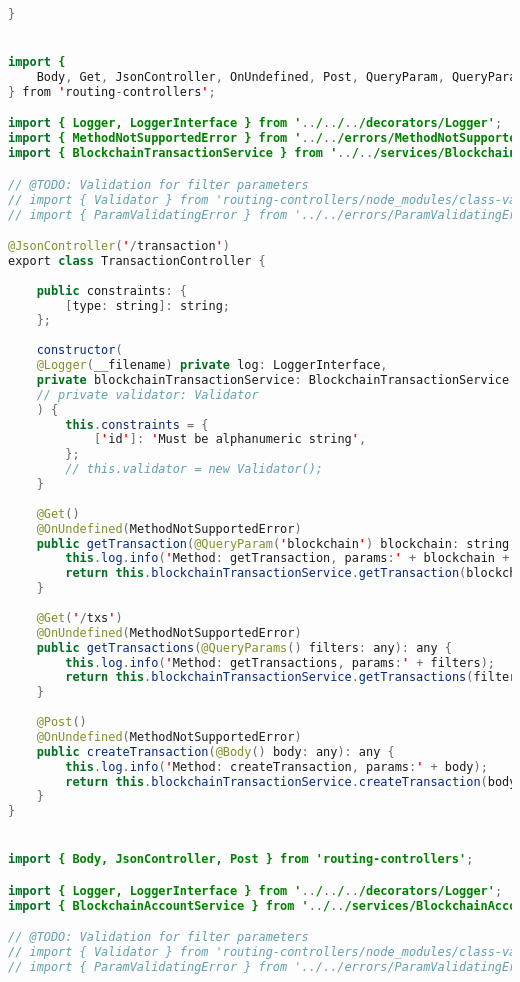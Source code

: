 \begin{lstlisting}[language=java]
}


import {
	Body, Get, JsonController, OnUndefined, Post, QueryParam, QueryParams
} from 'routing-controllers';

import { Logger, LoggerInterface } from '../../../decorators/Logger';
import { MethodNotSupportedError } from '../../errors/MethodNotSupportedError';
import { BlockchainTransactionService } from '../../services/BlockchainTransactionService';

// @TODO: Validation for filter parameters
// import { Validator } from 'routing-controllers/node_modules/class-validator';
// import { ParamValidatingError } from '../../errors/ParamValidatingError';

@JsonController('/transaction')
export class TransactionController {
	
	public constraints: {
		[type: string]: string;
	};
	
	constructor(
	@Logger(__filename) private log: LoggerInterface,
	private blockchainTransactionService: BlockchainTransactionService
	// private validator: Validator
	) {
		this.constraints = {
			['id']: 'Must be alphanumeric string',
		};
		// this.validator = new Validator();
	}
	
	@Get()
	@OnUndefined(MethodNotSupportedError)
	public getTransaction(@QueryParam('blockchain') blockchain: string, @QueryParam('txhash') txhash: string): any {
		this.log.info('Method: getTransaction, params:' + blockchain + ' ' + txhash);
		return this.blockchainTransactionService.getTransaction(blockchain, txhash);
	}
	
	@Get('/txs')
	@OnUndefined(MethodNotSupportedError)
	public getTransactions(@QueryParams() filters: any): any {
		this.log.info('Method: getTransactions, params:' + filters);
		return this.blockchainTransactionService.getTransactions(filters);
	}
	
	@Post()
	@OnUndefined(MethodNotSupportedError)
	public createTransaction(@Body() body: any): any {
		this.log.info('Method: createTransaction, params:' + body);
		return this.blockchainTransactionService.createTransaction(body);
	}
}


import { Body, JsonController, Post } from 'routing-controllers';

import { Logger, LoggerInterface } from '../../../decorators/Logger';
import { BlockchainAccountService } from '../../services/BlockchainAccountService';

// @TODO: Validation for filter parameters
// import { Validator } from 'routing-controllers/node_modules/class-validator';
// import { ParamValidatingError } from '../../errors/ParamValidatingError';


\end{lstlisting}
